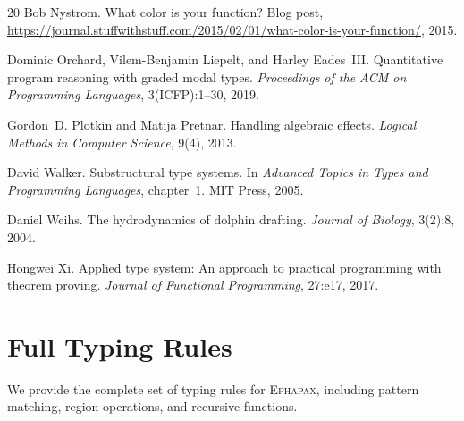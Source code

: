 \documentclass[11pt,a4paper]{article}
\newcommand{\Ephapax}{\textsc{Ephapax}}
\begin{document}
\begin{thebibliography}{20}
Bob Nystrom.
\newblock What color is your function?
\newblock Blog post, \url{https://journal.stuffwithstuff.com/2015/02/01/what-color-is-your-function/}, 2015.

Dominic Orchard, Vilem-Benjamin Liepelt, and Harley Eades~III.
\newblock Quantitative program reasoning with graded modal types.
\newblock \emph{Proceedings of the ACM on Programming Languages}, 3(ICFP):1--30, 2019.

Gordon~D. Plotkin and Matija Pretnar.
\newblock Handling algebraic effects.
\newblock \emph{Logical Methods in Computer Science}, 9(4), 2013.

David Walker.
\newblock Substructural type systems.
\newblock In \emph{Advanced Topics in Types and Programming Languages}, chapter~1. MIT Press, 2005.

Daniel Weihs.
\newblock The hydrodynamics of dolphin drafting.
\newblock \emph{Journal of Biology}, 3(2):8, 2004.

Hongwei Xi.
\newblock Applied type system: An approach to practical programming with theorem proving.
\newblock \emph{Journal of Functional Programming}, 27:e17, 2017.

\end{thebibliography}

\appendix

\section{Full Typing Rules}
\label{app:typing-rules}

We provide the complete set of typing rules for \Ephapax{}, including
pattern matching, region operations, and recursive functions.
\end{document}
